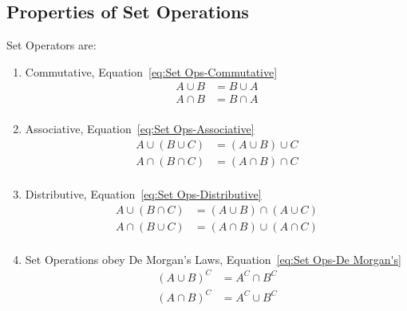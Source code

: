 \documentclass[10pt,letterpaper,final,twoside,notitlepage]{article}
\theoremstyle{plain}
\theoremstyle{definition}
\begin{document}
	\subsection{Properties of Set Operations} \label{subsec:Properties of Set Ops}
	Set Operators are:
	\begin{enumerate}
		\item Commutative, Equation~\eqref{eq:Set Ops-Commutative}
			\begin{equation} %
				\begin{aligned}
					A \cup B &= B \cup A \\
					A \cap B &= B \cap A \\
				\end{aligned}
				\label{eq:Set Ops-Commutative}
			\end{equation}
			
			\item Associative, Equation~\eqref{eq:Set Ops-Associative}
				\begin{equation} %
					\begin{aligned}
						A \cup \left( B \cup C \right) &= \left( A \cup B \right) \cup C \\
						A \cap \left( B \cap C \right) &= \left( A \cap B \right) \cap C \\
					\end{aligned}
					\label{eq:Set Ops-Associative}
				\end{equation}
			
			\item Distributive, Equation~\eqref{eq:Set Ops-Distributive}
				\begin{equation} %
					\begin{aligned}
						A \cup \left( B \cap C \right) &= \left( A \cup B \right) \cap \left( A \cup C \right) \\
						A \cap \left( B \cup C \right) &= \left( A \cap B \right) \cup \left( A \cap C \right) \\
					\end{aligned}
					\label{eq:Set Ops-Distributive}
				\end{equation}
			
			\item Set Operations obey De Morgan's Laws, Equation~\eqref{eq:Set Ops-De Morgan's}
				\begin{equation} %
					\begin{aligned}
						\left( A \cup B \right)^{C} &= A^{C} \cap B^{C} \\
						\left( A \cap B \right)^{C} &= A^{C} \cup B^{C} \\
					\end{aligned}
					\label{eq:Set Ops-De Morgan's}
				\end{equation}
			
	\end{enumerate}
\end{document}
